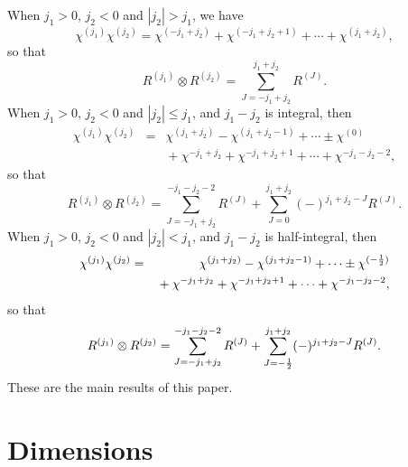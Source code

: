 \documentclass[a4paper,dvips,12pt]{article}
\newcommand {\half} {{1 \over 2}}
\begin{document}
    When $j_1 > 0$, $j_2 < 0$ and $|j_2| > j_1$, we have
    \begin{equation}
        \chi^{(j_1)}\chi^{(j_2)} = \chi^{(-j_1 + j_2)} + \chi^{(-j_1 + j_2 + 1)}
                + \cdots + \chi^{(j_1 + j_2)},
    \end{equation}
    so that
    \begin{equation}
        R^{(j_1)}\otimes R^{(j_2)} = \sum_{J = -j_1 + j_2}^{j_1 + j_2}
            R^{(J)}.
    \end{equation}
    When $j_1 > 0$, $j_2 < 0$ and $|j_2| \le j_1$, and $j_1 - j_2$
    is integral, then
    \begin{eqnarray}
        \chi^{(j_1)}\chi^{(j_2)} &=& \chi^{(j_1 + j_2)} - \chi^{(j_1 + j_2 - 1)}
          + \cdots \pm \chi^{(0)} \nonumber\\
          & & {} + \chi^{-j_1 + j_2} + \chi^{-j_1 + j_2 + 1} + \cdots
             +\chi^{-j_1 - j_2 - 2},
    \end{eqnarray}
    so that
    \begin{equation}
        R^{(j_1)}\otimes R^{(j_2)} =
            \sum_{J=-j_1 + j_2}^{-j_1 - j_2 -2} R^{(J)}
            + \sum_{J = 0}^{j_1 + j_2}
           (-)^{j_1 + j_2 - J} R^{(J)}.
    \end{equation}
    When $j_1 > 0$, $j_2 < 0$ and $|j_2| < j_1$, and $j_1 - j_2$
    is half-integral, then
    \begin{eqnarray}
        \chi^{(j_1)}\chi^{(j_2)} &=& \chi^{(j_1 + j_2)} - \chi^{(j_1 + j_2 - 1)}
          + \cdots \pm \chi^{(-\half)} \nonumber\\
          & & {} + \chi^{-j_1 + j_2} + \chi^{-j_1 + j_2 + 1} + \cdots
              + \chi^{-j_1 - j_2 - 2},
    \end{eqnarray}
    so that
    \begin{equation}
        R^{(j_1)}\otimes R^{(j_2)} =
            \sum_{J=-j_1 + j_2}^{-j_1 - j_2 -2} R^{(J)}
            + \sum_{J = -\half}^{j_1 + j_2}
           (-)^{j_1 + j_2 - J} R^{(J)}.
           \label{HALFINTDIFF}
    \end{equation}
    These are the main results of this paper.


    \section{Dimensions}
\end{document}
